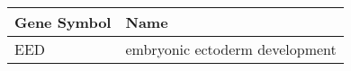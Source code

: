 \begin{tabular}{ll}
\toprule
Gene Symbol &                           Name \\
\midrule
        EED & embryonic ectoderm development \\
\bottomrule
\end{tabular}
